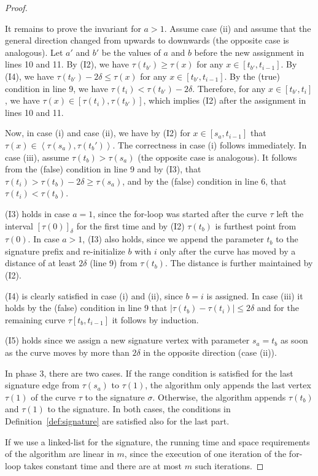 \documentclass[11pt, letter]{article}
\newcommand{\defref}[1]{Definition~\ref{def:#1}}
\providecommand{\cbrc}[1]{\left\langle{#1}\right\rangle}
\newcommand{\range}[2]{\ensuremath{[#1]_{#2}}}
\begin{document}
\begin{proof}
\begin{compactitem}
It remains to prove the invariant for $a>1$.
Assume case (ii) and assume that the general direction changed from
upwards to downwards (the opposite case is analogous). 
Let $a'$ and $b'$ be the values of $a$ and $b$ before the
new assignment in lines 10 and 11. By (I2),
we have $\tau(t_{b'}) \geq \tau(x)$ for any $x \in [t_{b'},t_{i-1}]$. By (I4), we
have $\tau(t_{b'})-2\delta \leq \tau(x)$ for any $x \in [t_{b'},t_{i-1}]$.
By the (true) condition in line 9, we have $\tau(t_i)<\tau(t_{b'})-2\delta$.
Therefore, for any $x \in [t_{b'}, t_i]$, we have
$\tau(x) \in [\tau(t_i),\tau(t_{b'})]$, which implies (I2) after the assignment
in lines 10 and 11.

Now, in case (i) and case (ii), we have by (I2)  for $x\in[s_a,t_{i-1}]$ 
that $\tau(x)\in \cbrc{\tau(s_a),\tau(t_b')}$. The correctness in case (i)
follows immediately. In case (iii), assume $\tau(t_b) > \tau(s_a)$ (the opposite
case is analogous). 
It follows from the (false) condition in line 9 and by (I3), that
$\tau(t_i) > \tau(t_b)-2\delta \geq \tau(s_a)$, and by the (false)
condition in line 6, that $\tau(t_i)<\tau(t_b)$. 

\item (I3) holds in case $a=1$, since the for-loop was 
started after the curve $\tau$ left the interval $\range{\tau(0)}{\delta}$
for the first time and by (I2) $\tau(t_b)$ is furthest
point from $\tau(0)$. In case $a>1$, (I3) also holds, since we append the
parameter $t_b$ to the signature prefix and re-initialize $b$ with $i$ only
after the curve has moved by a distance of at least $2\delta$ (line 9) from
$\tau(t_b)$. The distance is further maintained by (I2).

\item (I4) is clearly satisfied in case (i) and (ii), since $b=i$ is assigned.
In case (iii) it holds by the (false) condition in line 9 that
$|\tau(t_b)-\tau(t_i)|\leq 2\delta$ and for the remaining curve $\tau\left[
t_b, t_{i-1}\right]$ it follows by induction.

\item (I5) holds since we assign a new signature vertex with parameter $s_a=t_b$
as soon as the curve moves by more than $2\delta$ in the opposite direction (case (ii)).  
\end{compactitem}

In phase 3, there are two cases. If the range condition is satisfied for the
last signature edge from $\tau(s_a)$ to $\tau(1)$, the algorithm only appends
the last vertex $\tau(1)$ of the curve $\tau$ to the signature $\sigma$.
Otherwise, the algorithm appends $\tau(t_b)$ and $\tau(1)$ to the signature.  In
both cases, the conditions in \defref{signature} are satisfied also for the last
part. 

If we use a linked-list for the signature, the running time and space
requirements of the algorithm are linear in $m$, since the execution of one
iteration of the for-loop takes constant time and there are at most $m$ such
iterations.
\end{proof}
\end{document}
